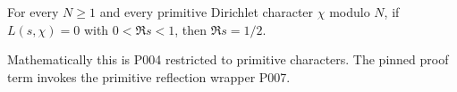 
\begin{formalstatement}\label{pn:P005}
For every $N\ge1$ and every primitive Dirichlet character $\chi$ modulo $N$, if $L(s,\chi)=0$ with $0<\Re s<1$, then $\Re s=1/2$.
\end{formalstatement}
Mathematically this is P004 restricted to primitive characters. The pinned proof term invokes the primitive reflection wrapper P007.
